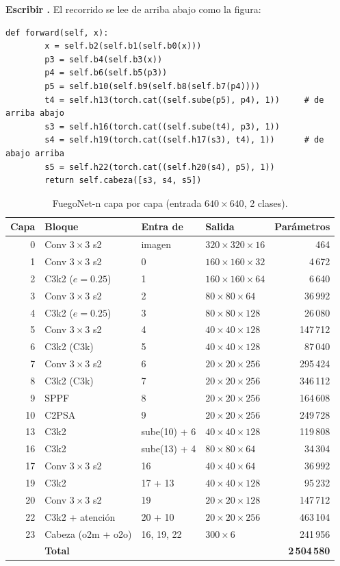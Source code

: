  \textbf{Escribir .}
El recorrido se lee de arriba abajo como la figura:
\begin{lstlisting}[style=py]
    def forward(self, x):
        x = self.b2(self.b1(self.b0(x)))
        p3 = self.b4(self.b3(x))
        p4 = self.b6(self.b5(p3))
        p5 = self.b10(self.b9(self.b8(self.b7(p4))))
        t4 = self.h13(torch.cat((self.sube(p5), p4), 1))     # de arriba abajo
        s3 = self.h16(torch.cat((self.sube(t4), p3), 1))
        s4 = self.h19(torch.cat((self.h17(s3), t4), 1))      # de abajo arriba
        s5 = self.h22(torch.cat((self.h20(s4), p5), 1))
        return self.cabeza([s3, s4, s5])
\end{lstlisting}

\begin{table}[H]
\centering\small
\caption{FuegoNet-n capa por capa (entrada $640\times640$, 2 clases).}
\label{tab:capas}
\begin{tabular}{rlllr}
\toprule
\textbf{Capa} & \textbf{Bloque} & \textbf{Entra de} & \textbf{Salida} & \textbf{Parámetros}\\
\midrule
0 & Conv $3{\times}3$ s2 & imagen & $320\times320\times16$ & 464\\
1 & Conv $3{\times}3$ s2 & 0 & $160\times160\times32$ & 4\,672\\
2 & C3k2 ($e=0.25$) & 1 & $160\times160\times64$ & 6\,640\\
3 & Conv $3{\times}3$ s2 & 2 & $80\times80\times64$ & 36\,992\\
4 & C3k2 ($e=0.25$) & 3 & $80\times80\times128$ & 26\,080\\
5 & Conv $3{\times}3$ s2 & 4 & $40\times40\times128$ & 147\,712\\
6 & C3k2 (C3k) & 5 & $40\times40\times128$ & 87\,040\\
7 & Conv $3{\times}3$ s2 & 6 & $20\times20\times256$ & 295\,424\\
8 & C3k2 (C3k) & 7 & $20\times20\times256$ & 346\,112\\
9 & SPPF & 8 & $20\times20\times256$ & 164\,608\\
10 & C2PSA & 9 & $20\times20\times256$ & 249\,728\\
13 & C3k2 & sube(10) + 6 & $40\times40\times128$ & 119\,808\\
16 & C3k2 & sube(13) + 4 & $80\times80\times64$ & 34\,304\\
17 & Conv $3{\times}3$ s2 & 16 & $40\times40\times64$ & 36\,992\\
19 & C3k2 & 17 + 13 & $40\times40\times128$ & 95\,232\\
20 & Conv $3{\times}3$ s2 & 19 & $20\times20\times128$ & 147\,712\\
22 & C3k2 + atención & 20 + 10 & $20\times20\times256$ & 463\,104\\
23 & Cabeza (o2m + o2o) & 16, 19, 22 & $300\times6$ & 241\,956\\
\midrule
& \textbf{Total} & & & \textbf{2\,504\,580}\\
\bottomrule
\end{tabular}
\end{table}


